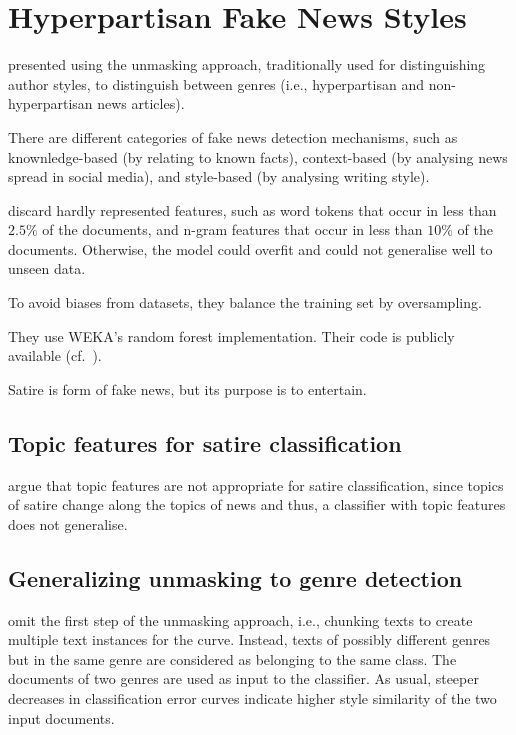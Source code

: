 \section{Hyperpartisan Fake News Styles}
\label{sec:hyperpartisan_fake_news_styles}

\citet{potthast_stylometric_2018} presented using the unmasking approach, traditionally used for distinguishing author styles, 
to distinguish between genres (i.e., hyperpartisan and non-hyperpartisan news articles). 

There are different categories of fake news detection mechanisms, such as knownledge-based (by relating to known facts), 
context-based (by analysing news spread in social media), and style-based (by analysing writing style).

\citet{potthast_stylometric_2018} discard hardly represented features, such as word tokens that occur in less than $2.5 \%$ of the documents, 
and n-gram features that occur in less than $10 \%$ of the documents.
Otherwise, the model could overfit and could not generalise well to unseen data.

To avoid biases from datasets, they balance the training set by oversampling.

They use WEKA's random forest implementation.
Their code is publicly available (cf.~\citep{potthast_stylometric_2018}). 

Satire is form of fake news, but its purpose is to entertain.

\subsection{Topic features for satire classification}
\label{sec:topic_features_for_sarcasm_classification}

\citet{potthast_stylometric_2018} argue that topic features are not appropriate for satire classification, 
since topics of satire change along the topics of news and thus, a classifier with topic features does not generalise.

\subsection{Generalizing unmasking to genre detection}
\label{sec:generalizing_unmasking_to_genre_detection}

\citet{potthast_stylometric_2018} omit the first step of the unmasking approach, i.e., chunking texts to create multiple text instances for the curve.
Instead, texts of possibly different genres but in the same genre are considered as belonging to the same class.
The documents of two genres are used as input to the classifier.
As usual, steeper decreases in classification error curves indicate higher style similarity of the two input documents.